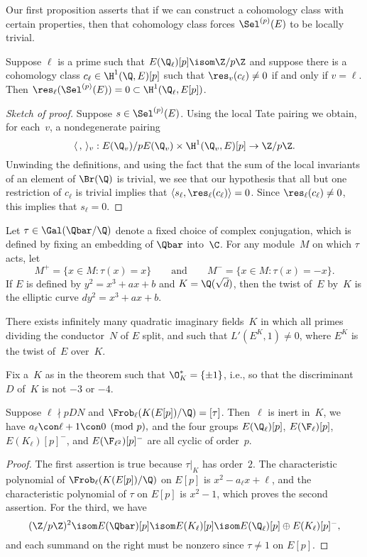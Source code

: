 \documentclass{report}
\begin{document}
Our first proposition asserts that if we can construct a cohomology
class with certain properties, then that cohomology class forces
$\Sel^{(p)}(E)$ to be locally trivial.
\begin{proposition}\label{prop:sel0}
  Suppose $\ell$ is a prime such that $E(\Q_\ell)[p] \isom \Z/p\Z$ and
  suppose there is a cohomology class $c_\ell\in\H^1(\Q,E)[p]$ such
that $\res_v(c_\ell) \neq 0$ if and only if $v=\ell$.
Then $\res_\ell(\Sel^{(p)}(E))=0\subset \H^1(\Q_\ell,E[p])$.
\end{proposition}
\begin{proof}[Sketch of proof]
  Suppose $s \in \Sel^{(p)}(E)$.  Using the local Tate pairing we
  obtain, for each~$v$, a nondegenerate pairing
$$
 \langle \, , \, \rangle_v : E(\Q_v)/ p E(\Q_v) \times \H^1(\Q_v,E)[p] \to \Z/p\Z.
 $$
 Unwinding the definitions, and using the fact that the sum of the
 local invariants of an element of $\Br(\Q)$ is trivial, we see that
 our hypothesis that all but one restriction of $c_\ell$ is trivial
 implies that $\langle s_\ell, \res_\ell(c_\ell)\rangle = 0$.  Since
 $\res_\ell(c_\ell)\neq 0$, this implies that $s_\ell=0$.
\end{proof}

Let $\tau\in\Gal(\Qbar/\Q)$ denote a fixed choice of complex
conjugation, which is defined by fixing an embedding of $\Qbar$
into~$\C$.  For any module~$M$ on which $\tau$ acts, let
$$M^+ = \{x \in M : \tau(x)=x \} \qquad\text{and}\qquad
M^- = \{x \in M : \tau(x)= -x \}.$$
If $E$ is defined by $y^2=x^3+ax+b$ and $K=\Q(\sqrt{d})$, then
the twist of~$E$ by~$K$ is the elliptic curve
$dy^2 = x^3 + ax + b$.

\begin{theorem}
  There exists infinitely many quadratic imaginary fields~$K$ in which
  all primes dividing the conductor~$N$ of $E$ split, and such that
  $L'(E^K,1)\neq 0$, where $E^K$ is the twist of~$E$ over~$K$.
\end{theorem}
Fix a~$K$ as in the theorem such that $\O_K^* = \{\pm 1\}$, i.e., so
that the discriminant~$D$ of~$K$ is not $-3$ or $-4$.

\begin{lemma}\label{lem:kollem}
  Suppose $\ell\nmid p DN$ and $\Frob_{\ell}(K(E[p])/\Q)=[\tau]$.
  Then~$\ell$ is inert in~$K$, we have $a_\ell \con \ell + 1\con
  0\pmod {p},$ and the four groups $E(\Q_\ell)[p]$, $E(\F_\ell)[p]$,
  $E(K_\ell)[p]^{-}$, and $E(\F_{\ell^2})[p]^-$ are all cyclic of
  order~$p$.
\end{lemma}
\begin{proof}
The first assertion is true because $\tau|_K$ has order~$2$.
The characteristic polynomial of $\Frob_{\ell}(K(E[p])/\Q)$ on $E[p]$
is $x^2 - a_\ell x + \ell$, and the characteristic polynomial of
$\tau$ on $E[p]$ is $x^2 - 1$, which proves the second assertion.
For the third, we have
$$
 (\Z/p\Z)^2\isom E(\Qbar)[p] \isom E(K_\ell)[p] \isom E(\Q_\ell)[p] \oplus E(K_\ell)[p]^-,
$$
and each summand on the right must be nonzero since $\tau\neq 1$ on $E[p]$.
\end{proof}
\end{document}
